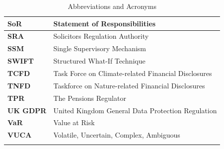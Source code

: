 \begin{longtable}{ | >{\raggedright\arraybackslash}p{} 
                  | >{\raggedright\arraybackslash}p{} | }
        \hline
        \textbf{SoR} & Statement of Responsibilities \\
        \hline
        \textbf{SRA} & Solicitors Regulation Authority \\
        \hline
        \textbf{SSM} & Single Supervisory Mechanism \\
        \hline
        \textbf{SWIFT} & Structured What-If Technique \\
        \hline
        \textbf{TCFD} & Task Force on Climate-related Financial Disclosures \\
        \hline
        \textbf{TNFD} & Taskforce on Nature-related Financial Disclosures \\
        \hline
        \textbf{TPR} & The Pensions Regulator \\
        \hline
        \textbf{UK GDPR} & United Kingdom General Data Protection Regulation \\
        \hline
        \textbf{VaR} & Value at Risk \\
        \hline
        \textbf{VUCA} & Volatile, Uncertain, Complex, Ambiguous \\
        \hline
  \caption{Abbreviations and Acronyms}
\end{longtable}
